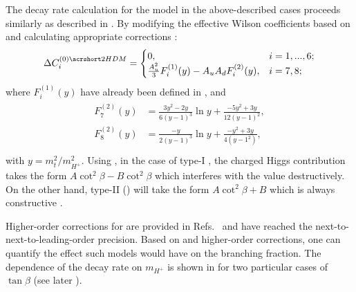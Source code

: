 The decay rate calculation for the \TwoHDM model in the above-described cases proceeds similarly as described in . 
By modifying the effective Wilson coefficients based on  and calculating appropriate corrections \cite{Ciuchini:1997xe}:
\begin{equation}\label{eq:partial_wilson_2hdm}
    \Delta C_i^{(0)\TwoHDM} = 
    \begin{cases}
        0, & i=1,...,6;\\
        \frac{A_u^2}{3}F_i^{(1)}(y) - A_uA_dF_i^{(2)}(y), & i=7,8;\\
    \end{cases}
\end{equation}
where $F_i^{(1)}(y)$ have already been defined in , and
\begin{align}
    \begin{split}
    F_7^{(2)}(y) &= \frac{3y^2-2y}{6(y-1)^3}\ln y + \frac{-5y^2+3y}{12(y-1)^2},\\
    F_8^{(2)}(y) &= \frac{-y}{2(y-1)^3}\ln y + \frac{-y^2+3y}{4(y-1^2)},\\
    \end{split}
\end{align}
with $y = m_t^2/m_{H^+}^2$.
Using , in the case of type-I \TwoHDM, the charged Higgs contribution takes the form $A\cot^2\beta-B\cot^2\beta$ which interferes with the \SM value destructively.
On the other hand, type-II \TwoHDM () will take the form $A\cot^2\beta+B$ which is always constructive \cite{Misiak:2017bgg}.

Higher-order corrections for \TwoHDM are provided in Refs.~\cite{Ciuchini:1997xe,Hermann:2012fc} and have reached the next-to-next-to-leading-order precision.
Based on  and higher-order corrections, one can quantify the effect such models would have on the \BtoXsgamma branching fraction.
The dependence of the \BtoXsgamma decay rate on $m_{H^+}$ is shown in  for two particular cases of $\tan\beta$ (see later ).


